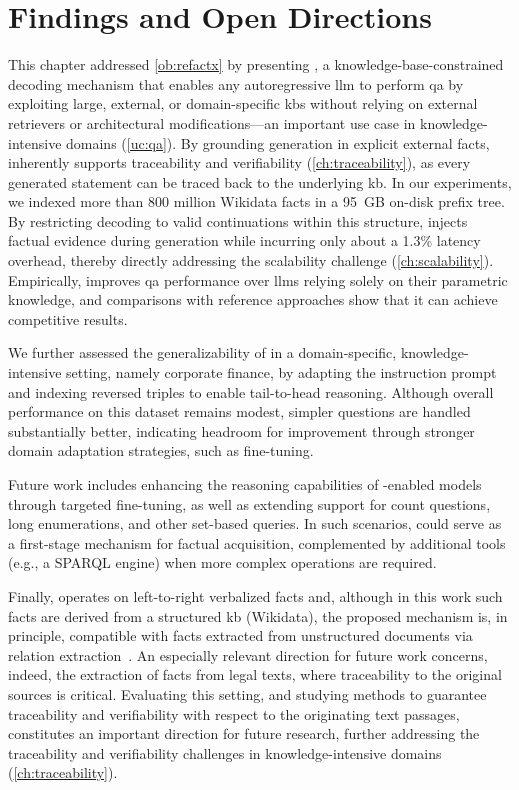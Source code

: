 \section{Findings and Open Directions}
\label{sec:rx:conclusion}


This chapter addressed \ref{ob:refactx} by presenting , a knowledge-base-constrained decoding mechanism that enables any autoregressive \ac{llm} to perform \ac{qa} by exploiting large, external, or domain-specific \acp{kb} without relying on external retrievers or architectural modifications---an important use case in knowledge-intensive domains (\ref{uc:qa}). By grounding generation in explicit external facts,  inherently supports traceability and verifiability (\ref{ch:traceability}), as every generated statement can be traced back to the underlying \ac{kb}. In our experiments, we indexed more than 800 million Wikidata facts in a 95~GB on-disk prefix tree. By restricting decoding to valid continuations within this structure,  injects factual evidence during generation while incurring only about a 1.3\% latency overhead, thereby directly addressing the scalability challenge (\ref{ch:scalability}). Empirically,  improves \ac{qa} performance over \acp{llm} relying solely on their parametric knowledge, and comparisons with reference approaches show that it can achieve competitive results.

We further assessed the generalizability of  in a domain-specific, knowledge-intensive setting, namely corporate finance, by adapting the instruction prompt and indexing reversed triples to enable tail-to-head reasoning. Although overall performance on this dataset remains modest, simpler questions are handled substantially better, indicating headroom for improvement through stronger domain adaptation strategies, such as fine-tuning.

Future work includes enhancing the reasoning capabilities of -enabled models through targeted fine-tuning, as well as extending support for count questions, long enumerations, and other set-based queries. In such scenarios,  could serve as a first-stage mechanism for factual acquisition, complemented by additional tools (e.g., a SPARQL engine) when more complex operations are required.

Finally,  operates on left-to-right verbalized facts and, although in this work such facts are derived from a structured \ac{kb} (Wikidata), the proposed mechanism is, in principle, compatible with facts extracted from unstructured documents via relation extraction~\cite{jm3}.
An especially relevant direction for future work concerns, indeed, the extraction of facts from legal texts, where traceability to the original sources is critical. Evaluating this setting, and studying methods to guarantee traceability and verifiability with respect to the originating text passages, constitutes an important direction for future research, further addressing the traceability and verifiability challenges in knowledge-intensive domains (\ref{ch:traceability}).



